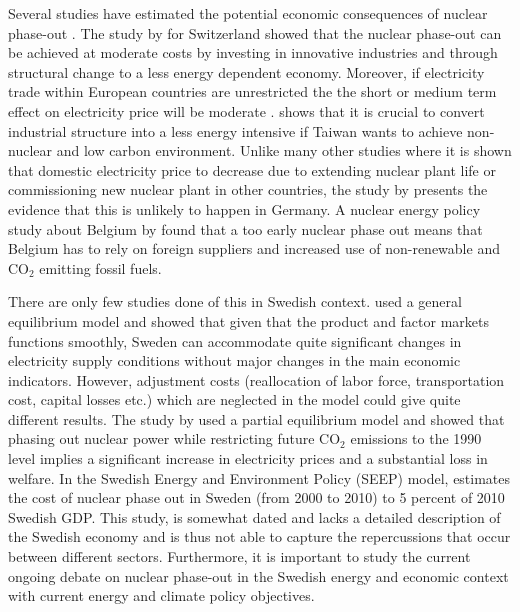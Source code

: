 Several studies have estimated the potential economic consequences of nuclear phase-out \citep{Bohringer2002, Nestle2012, Bretschger2012, Duscha0, Glomsrod2013, Kunsch2014}. The study by \cite{Bretschger2012} for Switzerland showed that the nuclear phase-out can be achieved at moderate costs by investing in innovative industries and through structural change to a less energy dependent economy. Moreover, if electricity trade within European countries are unrestricted the the short or medium term effect on electricity price will be moderate \citep{Glomsrod2013}. \cite{Chen2013} shows that it is crucial to convert industrial structure into a less energy intensive if Taiwan wants to achieve non-nuclear and low carbon environment. Unlike many other studies where it is shown that domestic electricity price to decrease due to extending nuclear plant life or commissioning new nuclear plant in other countries, the study by \citep{Nestle2012} presents the evidence that this is unlikely to happen in Germany. A nuclear energy policy study about Belgium by \cite{Kunsch2014} found that a too early nuclear phase out means that Belgium has to rely on foreign suppliers and increased use of non-renewable and CO$_2$ emitting fossil fuels.

There are only few studies done of this in Swedish context. \cite{Bergman1981} used a general equilibrium model and showed that given that the product and factor markets functions smoothly, Sweden can accommodate quite significant changes in electricity supply conditions without major changes in the main economic indicators. However, adjustment costs (reallocation of labor force, transportation cost, capital losses etc.) which are neglected in the model could give quite different results. The study by \cite{Andersson1997} used a partial equilibrium model and showed that phasing out nuclear power while restricting future CO$_2$ emissions to the 1990 level implies a significant increase in electricity prices and a substantial loss in welfare. In the Swedish Energy and Environment Policy (SEEP) model, \cite{nordhaus1997swedish} estimates the cost of nuclear phase out in Sweden (from 2000 to 2010) to 5 percent of 2010 Swedish GDP. This study, is somewhat dated and lacks a detailed description of the Swedish economy and is thus not able to capture the repercussions that occur between different sectors. Furthermore, it is important to study the current ongoing debate on nuclear phase-out in the Swedish energy and economic context with current energy and climate policy objectives.

